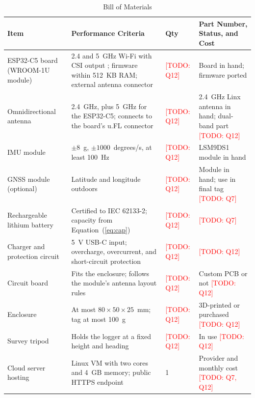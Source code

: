 \documentclass[12pt,letterpaper]{article}
\newenvironment{spectable}{\setstretch{1.0}\renewcommand{\arraystretch}{1.1}}{}
\newcommand{\TODO}[1]{\textcolor{red}{[TODO: #1]}}
\begin{document}
\begin{table}[H]
\caption{Bill of Materials}
\label{tab:bom}
\centering
\begin{spectable}
\begin{tabularx}{\linewidth}{@{}L{1.25in} Y L{0.65in} L{1.25in}@{}}
\toprule
\textbf{Item} & \textbf{Performance Criteria} & \textbf{Qty} & \textbf{Part Number, Status, and Cost} \\
\midrule
ESP32-C5 board (WROOM-1U module) & 2.4 and 5~GHz Wi-Fi with CSI output \cite{espcsi}; firmware within 512~KB RAM; external antenna connector & \TODO{Q12} & Board in hand; firmware ported \\ \addlinespace
Omnidirectional antenna & 2.4~GHz, plus 5~GHz for the ESP32-C5; connects to the board's u.FL connector & \TODO{Q12} & 2.4~GHz Linx antenna in hand; dual-band part \TODO{Q12} \\ \addlinespace
IMU module & $\pm 8$~g, $\pm 1000$~degrees/s, at least 100~Hz & \TODO{Q12} & LSM9DS1 module in hand \\ \addlinespace
GNSS module (optional) & Latitude and longitude outdoors & \TODO{Q12} & Module in hand; use in final tag \TODO{Q7} \\ \addlinespace
Rechargeable lithium battery & Certified to IEC 62133-2; capacity from Equation~(\ref{eq:cap}) & \TODO{Q12} & \TODO{Q7} \\ \addlinespace
Charger and protection circuit & 5~V USB-C input; overcharge, overcurrent, and short-circuit protection & \TODO{Q12} & \TODO{Q12} \\ \addlinespace
Circuit board & Fits the enclosure; follows the module's antenna layout rules & \TODO{Q12} & Custom PCB or not \TODO{Q12} \\ \addlinespace
Enclosure & At most $80 \times 50 \times 25$~mm; tag at most 100~g & \TODO{Q12} & 3D-printed or purchased \TODO{Q12} \\ \addlinespace
Survey tripod & Holds the logger at a fixed height and heading & \TODO{Q12} & In use \TODO{Q12} \\ \addlinespace
Cloud server hosting & Linux VM with two cores and 4~GB memory; public HTTPS endpoint & 1 & Provider and monthly cost \TODO{Q7, Q12} \\
\bottomrule
\end{tabularx}
\end{spectable}
\end{table}
\end{document}
